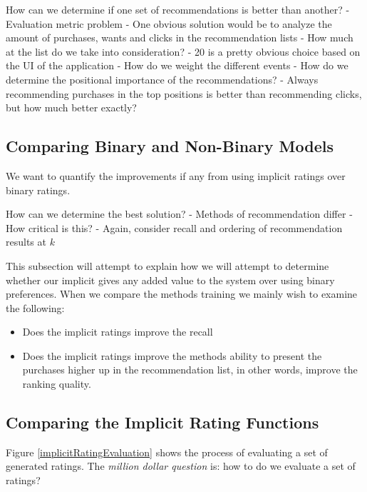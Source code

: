 How can we determine if one set of recommendations is better than another?
	- Evaluation metric problem
	- One obvious solution would be to analyze the amount of purchases, wants and clicks
	  in the recommendation lists
	  	- How much at the list do we take into consideration?
	  		- 20 is a pretty obvious choice based on the UI of the application
	  	- How do we weight the different events
	  	- How do we determine the positional importance of the recommendations?
	  		- Always recommending purchases in the top positions is better than
	  		  recommending clicks, but how much better exactly?


\subsection{Comparing Binary and Non-Binary Models}

We want to quantify the improvements if any from using implicit ratings over binary ratings.

How can we determine the best solution?
	- Methods of recommendation differ
		- How critical is this?
	- Again, consider recall and ordering of recommendation results at $k$



This subsection will attempt to explain how we will attempt to determine whether our implicit gives any added value to the system over using binary preferences.
When we compare the methods training we mainly wish to examine the following:

\begin{itemize}
\item Does the implicit ratings improve the recall
\item Does the implicit ratings improve the methods ability to present the purchases higher up in the recommendation list,
in other words, improve the ranking quality.
\end{itemize}


\subsection{Comparing the Implicit Rating Functions}

Figure \ref{implicitRatingEvaluation} shows the process of evaluating a set of generated ratings. The \emph{million dollar question} is: how to do we evaluate a set of ratings?

